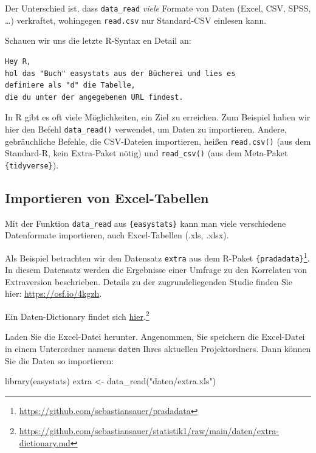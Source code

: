 \documentclass[
  a4paper,
  DIV=11]{scrreprt}
\newenvironment{Shaded}{\begin{snugshade}}{\end{snugshade}}
\newcommand{\FunctionTok}[1]{\textcolor[rgb]{0.28,0.35,0.67}{#1}}
\newcommand{\NormalTok}[1]{\textcolor[rgb]{0.00,0.23,0.31}{#1}}
\newcommand{\OtherTok}[1]{\textcolor[rgb]{0.00,0.23,0.31}{#1}}
\newcommand{\StringTok}[1]{\textcolor[rgb]{0.13,0.47,0.30}{#1}}
\theoremstyle{definition}
\theoremstyle{definition}
\theoremstyle{definition}
\theoremstyle{remark}
\begin{document}
Der Unterschied ist, dass \texttt{data\_read} \emph{viele} Formate von
Daten (Excel, CSV, SPSS, \ldots) verkraftet, wohingegen
\texttt{read.csv} nur Standard-CSV einlesen kann.

Schauen wir uns die letzte R-Syntax en Detail an:

\begin{verbatim}
Hey R,
hol das "Buch" easystats aus der Bücherei und lies es
definiere als "d" die Tabelle,
die du unter der angegebenen URL findest.
\end{verbatim}

In R gibt es oft viele Möglichkeiten, ein Ziel zu erreichen. Zum
Beispiel haben wir hier den Befehl \texttt{data\_read()} verwendet, um
Daten zu importieren. Andere, gebräuchliche Befehle, die CSV-Dateien
importieren, heißen \texttt{read.csv()} (aus dem Standard-R, kein
Extra-Paket nötig) und \texttt{read\_csv()} (aus dem Meta-Paket
\texttt{\{tidyverse\}}).

\subsection{Importieren von
Excel-Tabellen}\label{importieren-von-excel-tabellen}

Mit der Funktion \texttt{data\_read} aus \texttt{\{easystats\}} kann man
viele verschiedene Datenformate importieren, auch Excel-Tabellen (.xls,
.xlsx).

Als Beispiel betrachten wir den Datensatz \texttt{extra} aus dem R-Paket
\texttt{\{pradadata\}}\footnote{\url{https://github.com/sebastiansauer/pradadata}}.
In diesem Datensatz werden die Ergebnisse einer Umfrage zu den
Korrelaten von Extraversion beschrieben. Details zu der
zugrundeliegenden Studie finden Sie hier: \url{https://osf.io/4kgzh}.

Ein Daten-Dictionary findet sich
\href{https://github.com/sebastiansauer/statistik1/raw/main/daten/extra-dictionary.md}{hier}.\footnote{\url{https://github.com/sebastiansauer/statistik1/raw/main/daten/extra-dictionary.md}}

Laden Sie die Excel-Datei herunter. Angenommen, Sie speichern die
Excel-Datei in einem Unterordner namens \texttt{daten} Ihres aktuellen
Projektordners. Dann können Sie die Daten so importieren:

\begin{Shaded}
\begin{Highlighting}[]
\FunctionTok{library}\NormalTok{(easystats)}
\NormalTok{extra }\OtherTok{\textless{}{-}} \FunctionTok{data\_read}\NormalTok{(}\StringTok{"daten/extra.xls"}\NormalTok{)}
\end{Highlighting}
\end{Shaded}
\end{document}
